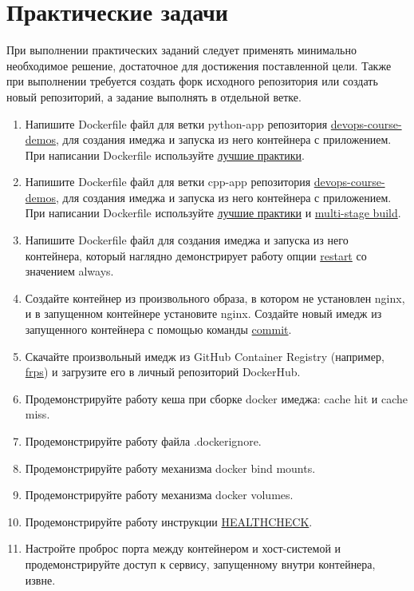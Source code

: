 \documentclass[12pt,a4paper]{article}
\begin{document}
\section{Практические задачи}
При выполнении практических заданий следует применять минимально необходимое решение, достаточное для достижения поставленной цели.
Также при выполнении требуется создать форк исходного репозитория или создать новый репозиторий, а задание выполнять в отдельной ветке.
\begin{enumerate}
    \item Напишите Dockerfile файл для ветки python-app репозитория \href{https://github.com/prafdin/devops-course-demos}{devops-course-demos},
    для создания имеджа и запуска из него контейнера с приложением. При написании Dockerfile используйте
    \href{https://docs.docker.com/build/building/best-practices}{лучшие практики}.
    \item Напишите Dockerfile файл для ветки cpp-app репозитория \href{https://github.com/prafdin/devops-course-demos}{devops-course-demos},
    для создания имеджа и запуска из него контейнера с приложением. При написании Dockerfile используйте
    \href{https://docs.docker.com/build/building/best-practices}{лучшие практики} и
    \href{https://docs.docker.com/get-started/docker-concepts/building-images/multi-stage-builds/}{multi-stage build}.
    \item Напишите Dockerfile файл для создания имеджа и запуска из него контейнера, который наглядно демонстрирует работу
    опции \href{https://docs.docker.com/reference/cli/docker/container/run/#restart}{restart} со значением always.
    \item Создайте контейнер из произвольного образа, в котором не установлен nginx, и в запущенном контейнере установите nginx.
    Создайте новый имедж из запущенного контейнера с помощью команды \href{https://docs.docker.com/reference/cli/docker/container/commit/}{commit}.
    \item Скачайте произвольный имедж из GitHub Container Registry (например, \href{https://github.com/fatedier/frp/pkgs/container/frps}{frps})
    и загрузите его в личный репозиторий DockerHub.
    \item Продемонстрируйте работу кеша при сборке docker имеджа: cache hit и cache miss.
    \item Продемонстрируйте работу файла .dockerignore.
    \item Продемонстрируйте работу механизма docker bind mounts.
    \item Продемонстрируйте работу механизма docker volumes.
    \item Продемонстрируйте работу инструкции \href{https://docs.docker.com/reference/dockerfile/#healthcheck}{HEALTHCHECK}.
    \item Настройте проброс порта между контейнером и хост-системой и продемонстрируйте доступ к сервису,
    запущенному внутри контейнера, извне.
\end{enumerate}
\end{document}

